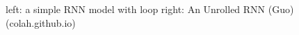 \documentclass[letterpaper, 10 pt, conference]{ieeeconf}  %
\begin{document}
\begin{figure}[thpb]
        \centering
  \caption{left: a simple RNN model with loop \newline right: An Unrolled RNN (Guo) (colah.github.io)}
        \label{figurelabel}
     \end{figure}
\end{document}
